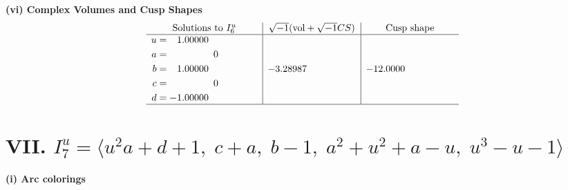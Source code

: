 \documentclass[1p]{elsarticle_modified}
\theoremstyle{definition}
\newcommand{\I}{\sqrt{-1}}
\begin{document}
\newpage\flushleft \textbf{(vi) Complex Volumes and Cusp Shapes}
$$\begin{array}{c|c|c}  
\text{Solutions to }I^u_{6}& \I (\text{vol} + \sqrt{-1}CS) & \text{Cusp shape}\\
 \hline 
\begin{aligned}
u &= \phantom{-}1.00000\phantom{ +0.000000I} \\
a &= \phantom{-0.000000 } 0 \\
b &= \phantom{-}1.00000\phantom{ +0.000000I} \\
c &= \phantom{-0.000000 } 0 \\
d &= -1.00000\phantom{ +0.000000I}\end{aligned}
 & -3.28987\phantom{ +0.000000I} & -12.0000\phantom{ +0.000000I}\\
 \hline 
 \end{array}$$\newpage\newpage\renewcommand{\arraystretch}{1}
\centering \section*{VII. $I^u_{7}= \langle u^2 a+d+1,\;c+a,\;b-1,\;a^2+u^2+a- u,\;u^3- u-1 \rangle$}
\flushleft \textbf{(i) Arc colorings}\\
\end{document}
